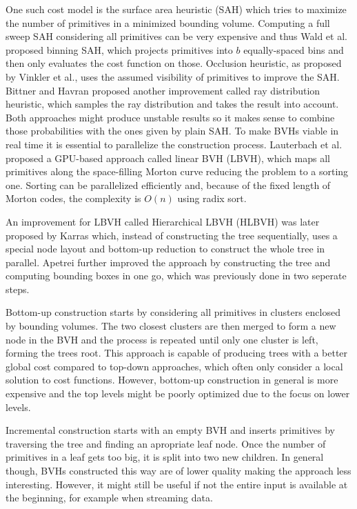 One such cost model is the surface area heuristic (SAH)\cite{goldsmith_automatic_1987,macdonald_heuristics_1990} which tries to maximize the number of primitives in a minimized bounding volume. Computing a full sweep SAH considering all primitives can be very expensive and thus Wald et al.\cite{wald07fastConstruction} proposed binning SAH, which projects primitives into $b$ equally-spaced bins and then only evaluates the cost function on those.
Occlusion heuristic, as proposed by Vinkler et al.\cite{vinkler12visibility}, uses the assumed visibility of primitives to improve the SAH.
Bittner and Havran\cite{bittner09rdh} proposed another improvement called ray distribution heuristic, which samples the ray distribution and takes the result into account. Both approaches might produce unstable results so it makes sense to combine those probabilities with the ones given by plain SAH. 
To make BVHs viable in real time it is essential to parallelize the construction process. Lauterbach et al.\cite{lauterbach09lbvh} proposed a GPU-based approach called linear BVH (LBVH), which maps all primitives along the space-filling Morton curve\cite{morton66curve} reducing the problem to a sorting one. Sorting can be parallelized efficiently and, because of the fixed length of Morton codes, the complexity is $O(n)$ using radix sort. 

An improvement for LBVH called Hierarchical LBVH (HLBVH) was later proposed by Karras\cite{karras12lbvh} which, instead of constructing the tree sequentially, uses a special node layout and bottom-up reduction to construct the whole tree in parallel. Apetrei\cite{apetrei14lbvh} further improved the approach by constructing the tree and computing bounding boxes in one go, which was previously done in two seperate steps. 

Bottom-up construction\cite{Walter2008FastAC} starts by considering all primitives in clusters enclosed by bounding volumes. The two closest clusters are then merged to form a new node in the BVH and the process is repeated until only one cluster is left, forming the trees root.
This approach is capable of producing trees with a better global cost compared to top-down approaches, which often only consider a local solution to cost functions. However, bottom-up construction in general is more expensive and the top levels might be poorly optimized due to the focus on lower levels.

Incremental construction\cite{goldsmith_automatic_1987} starts with an empty BVH and inserts primitives by traversing the tree and finding an apropriate leaf node. Once the number of primitives in a leaf gets too big, it is split into two new children. In general though, BVHs constructed this way are of lower quality making the approach less interesting. However, it might still be useful if not the entire input is available at the beginning, for example when streaming data.

